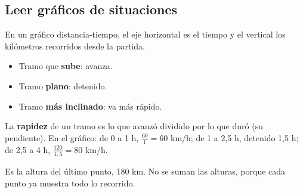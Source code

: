\subsection{Leer gráficos de situaciones}
En un gráfico distancia-tiempo, el eje horizontal es el tiempo y el vertical los kilómetros recorridos desde la partida.
\par\noindent\begin{minipage}{0.55\linewidth}
\begin{itemize}
  \item Tramo que \textbf{sube}: avanza.
  \item Tramo \textbf{plano}: detenido.
  \item Tramo \textbf{más inclinado}: va más rápido.
\end{itemize}
La \textbf{rapidez} de un tramo es lo que avanzó dividido por lo que duró (su pendiente). En el gráfico: de 0 a 1 h, $\frac{60}{1} = 60$ km/h; de 1 a 2,5 h, detenido 1,5 h; de 2,5 a 4 h, $\frac{120}{1{,}5} = 80$ km/h.
\end{minipage}\hfill
\begin{minipage}{0.4\linewidth}\centering
{}
\end{minipage}
\begin{ojo} Es la altura del último punto, 180 km. No se suman las alturas, porque cada punto ya muestra todo lo recorrido.\end{ojo}

